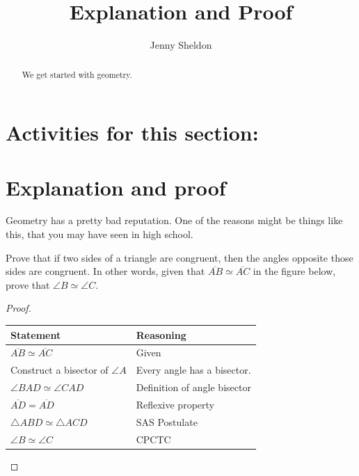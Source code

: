 \documentclass{ximera}
\title{Explanation and Proof}
\author{Jenny Sheldon}
\begin{document}
\begin{abstract}
We get started with geometry.
\end{abstract}
\maketitle


\section{Activities for this section:} 

\section{Explanation and proof}

Geometry has a pretty bad reputation. One of the reasons might be things like this, that you may have seen in high school.

\begin{theorem}
	Prove that if two sides of a triangle are congruent, then the angles opposite those sides are congruent. In other words, given that $\overline{AB} \simeq \overline{AC}$ in the figure below, prove that $\angle B \simeq \angle C$.
	\begin{image}
	\end{image}
\end{theorem}

\begin{proof}

\begin{tabular}{l|l} \hline
{\bf Statement} & {\bf Reasoning} \\ \hline
$\overline{AB} \simeq \overline{AC}$ & Given \\ \hline
Construct a bisector of $\angle A$ & Every angle has a bisector. \\ \hline
$\angle BAD \simeq \angle CAD$ & Definition of angle bisector \\ \hline
$\overline{AD} = \overline{AD}$ & Reflexive property \\ \hline
$\triangle ABD \simeq \triangle ACD$ & SAS Postulate \\ \hline
$\angle B \simeq \angle C$ & CPCTC \\ \hline
\end{tabular}
\end{proof}
\end{document}
